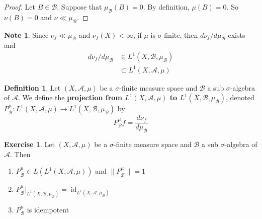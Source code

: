 \documentclass{book}
\theoremstyle{definition}
\newtheorem{defn}[definition]{Definition}
\newtheorem{note}[definition]{Note}
\newtheorem{ex}[definition]{Exercise}
\newcommand{\sig}{\sigma}
\newcommand{\MA}{\mathcal{A}}
\newcommand{\MB}{\mathcal{B}}
\DeclareMathOperator{\id}{id}
\DeclareMathOperator*{\0}{\mbf{0}}
\DeclareMathOperator*{\1}{\mbf{1}}
\begin{document}
	\begin{proof}
		Let $B \in \MB$. Suppose that $\mu_{\MB}(B) = 0$. By definition, $\mu(B) = 0$. So $\nu(B) = 0$ and $\nu \ll \mu_{\MB}$.
	\end{proof}
	
	\begin{note}
		Since $\nu_f \ll \mu_{\MB}$ and $\nu_f(X) < \infty$, if $\mu$ is $\sig$-finite, then $d \nu_{f} / d \mu_{\MB}$ exists and 
		\begin{align*}
			d \nu_{f} / d \mu_{\MB} 
			& \in L^1(X, \MB, \mu_{\MB}) \\
			& \subset L^1(X, \MA, \mu)
		\end{align*}
	\end{note}
	
	\begin{defn}
		Let $(X, \MA, \mu)$ be a $\sig$-finite measure space and $\MB$ a sub $\sig$-algebra of $\MA$. We define the \textbf{projection from $L^1(X, \MA, \mu)$ to $L^1(X, \MB, \mu_{\MB})$}, denoted $P^{\mu}_{\MB}:L^1(X, \MA, \mu) \rightarrow L^1(X, \MB, \mu_{\MB})$ by 
		$$P^{\mu}_{\MB}f = \frac{d \nu_f}{d \mu_{\MB}}$$ 
	\end{defn}
	
	\begin{ex}
		Let $(X, \MA, \mu)$ be a $\sig$-finite measure space and $\MB$ a sub $\sig$-algebra of $\MA$. Then 
		\begin{enumerate}
			\item $P^{\mu}_{\MB} \in L(L^1(X, \MA, \mu))$ and $\|P^{\mu}_{\MB}\| = 1$
			\item $P^{\mu}_{\MB}|_{L^1(X, \MB, \mu_{\MB})} = \id_{L^1(X, \MA, \mu_{\MB})}$ 
			\item $P^{\mu}_{\MB}$ is idempotent
		\end{enumerate}
	\end{ex}
	
\end{document}
